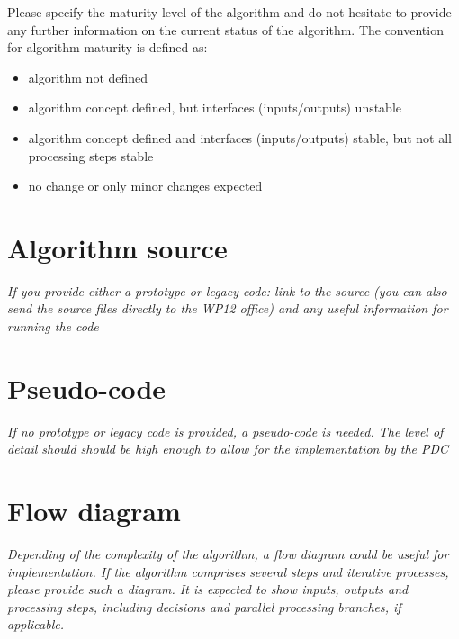 \documentclass[a4paper, oneside, 11pt, article, english]{memoir}
\begin{document}
{
  \itshape

  Please specify the maturity level of the algorithm and do not hesitate to
  provide any further information on the current status of the algorithm. The
  convention for algorithm maturity is defined as:

  \begin{itemize}
    \firmlist
  \item algorithm not defined
  \item algorithm concept defined, but interfaces (inputs/outputs) unstable
  \item algorithm concept defined and interfaces (inputs/outputs) stable, but
    not all processing steps stable
  \item no change or only minor changes expected
  \end{itemize}

}


\section{Algorithm source}
\label{sec:source}

\emph{If you provide either a prototype or legacy code: link to the source (you
  can also send the source files directly to the WP12 office) and any useful
  information for running the code}


\section{Pseudo-code}
\label{sec:pseudo}

\emph{If no prototype or legacy code is provided, a pseudo-code is needed.
  The level of detail should should be high enough to allow for the
  implementation by the PDC}


\section{Flow diagram}
\label{sec:flowchart}

\emph{Depending of the complexity of the algorithm, a flow diagram could be
  useful for implementation. If the algorithm comprises several steps and
  iterative processes, please provide such a diagram. It is expected to show
  inputs, outputs and processing steps, including decisions and parallel
  processing branches, if applicable.}
\end{document}
